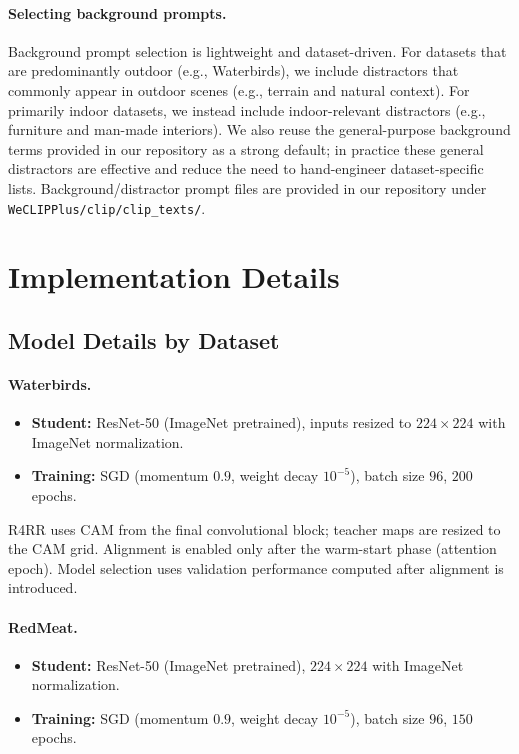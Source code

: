 \documentclass[10pt,twocolumn,letterpaper]{article}
\begin{document}
\paragraph{Selecting background prompts.}
Background prompt selection is lightweight and dataset-driven. For datasets that are predominantly outdoor (e.g., Waterbirds), we include distractors that commonly appear in outdoor scenes (e.g., terrain and natural context). For primarily indoor datasets, we instead include indoor-relevant distractors (e.g., furniture and man-made interiors). We also reuse the general-purpose background terms provided in our repository as a strong default; in practice these general distractors are effective and reduce the need to hand-engineer dataset-specific lists. Background/distractor prompt files are provided in our repository under \texttt{WeCLIPPlus/clip/clip\_texts/}.



\section{Implementation Details}
\label{appendix:implementation_details}

\subsection{Model Details by Dataset}\label{appendix:model_details}
\paragraph{Waterbirds.}
\begin{itemize}
    \item \textbf{Student:} ResNet-50\cite{he2016deep} (ImageNet pretrained), inputs resized to $224\times224$ with ImageNet normalization. 
    \item \textbf{Training:} SGD (momentum $0.9$, weight decay $10^{-5}$), batch size $96$, $200$ epochs. 
\end{itemize}

R4RR uses CAM from the final convolutional block; teacher maps are resized to the CAM grid. Alignment is enabled only after the warm-start phase (attention epoch). Model selection uses validation performance computed after alignment is introduced.

\paragraph{RedMeat.}
\begin{itemize}
    \item \textbf{Student:} ResNet-50\cite{he2016deep} (ImageNet pretrained), $224\times224$ with ImageNet normalization. 
    \item \textbf{Training:} SGD (momentum $0.9$, weight decay $10^{-5}$), batch size $96$, $150$ epochs. 
\end{itemize}
\end{document}
